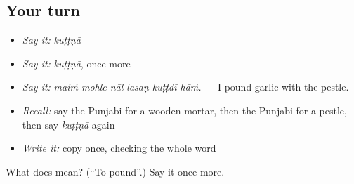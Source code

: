 \subsection*{Your turn}
\begin{itemize}
\raggedright
  \item \emph{Say it:} \emph{kuṭṭṇā}
  \item \emph{Say it:} \emph{kuṭṭṇā}, once more
  \item \emph{Say it:} \emph{maiṁ mohle nāl lasaṇ kuṭṭdī hāṁ.} — I pound garlic with the pestle.
  \item \emph{Recall:} say the Punjabi for a wooden mortar, then the Punjabi for a pestle, then say \emph{kuṭṭṇā} again
  \item \emph{Write it:} copy \textbf{} once, checking the whole word
\end{itemize}

\begin{tcolorbox}[breakable,colback=teal!4,colframe=teal!35!black,title={Before you move on}]
What does  mean? (\textquotedblleft{}To pound\textquotedblright{}.) Say it once more.
\end{tcolorbox}
